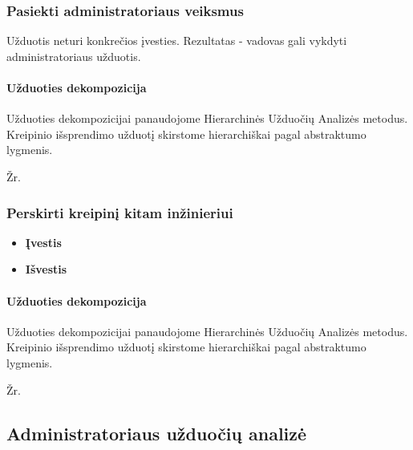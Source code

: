  		
	\subsubsection{Pasiekti administratoriaus veiksmus}

	Užduotis neturi konkrečios įvesties. 
	Rezultatas - vadovas gali vykdyti administratoriaus užduotis.
		
		
	\paragraph{Užduoties dekompozicija}
	

	Užduoties dekompozicijai panaudojome Hierarchinės Užduočių Analizės metodus.
	Kreipinio išsprendimo užduotį skirstome hierarchiškai pagal abstraktumo lygmenis. 
	
	Žr. 	
	
 		
	\subsubsection{Perskirti kreipinį kitam inžinieriui}

		\begin{itemize}
			\item \textbf{Įvestis}
			\item \textbf{Išvestis} 
		\end{itemize}
		
		
	\paragraph{Užduoties dekompozicija}
	

	Užduoties dekompozicijai panaudojome Hierarchinės Užduočių Analizės metodus.
	Kreipinio išsprendimo užduotį skirstome hierarchiškai pagal abstraktumo lygmenis. 
	
	Žr. 
	
 	
\subsection{Administratoriaus užduočių analizė}

